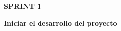 \documentclass[a4paper]{article} %
\begin{document}

    \clearpage  %
    \begin{doublespace}     %
    \tableofcontents %
    \end{doublespace}
    \clearpage  %




\clearpage  %

\hfill
\vfill
\begin{center}
    \Huge \textbf{SPRINT 1 }\par\vspace{1cm}
    \huge \textbf{Iniciar el desarrollo del proyecto}
\end{center}
\vfill
\hfill


\clearpage  %


\end{document}
